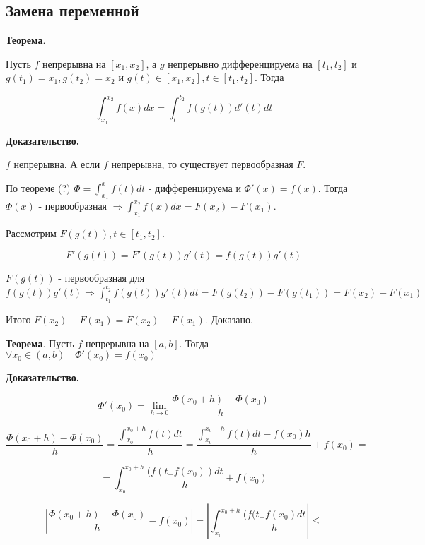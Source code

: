 \documentclass[a4paper]{article}
\begin{document}
\begin{definit}
\hypertarget{p17}{}
\subsection*{Замена переменной}

\begin{htheorem}\textbf{Теорема}.

Пусть $f$ непрерывна на $[x_1, x_2]$, а $g$ непрерывно дифференцируема на $[t_1, t_2]$ и $g(t_1) = x_1, g(t_2) = x_2$ и $g(t) \in [x_1, x_2], t \in [t_1, t_2]$. Тогда

\[
\int_{x_1}^{x_2} f(x)dx = \int_{t_1}^{t_2} f(g(t)) d'(t)dt
\]
\end{htheorem}

\begin{hproof}\textbf{Доказательство.}

$f$ непрерывна. А если $f$ непрерывна, то существует первообразная $F$.

По теореме (?) $\Phi = \int_{x_1}^x f(t)dt$ - дифференцируема и $\Phi'(x) = f(x)$. Тогда $\Phi(x)$ - первообразная $\Rightarrow \int_{x_1}^{x_2} f(x)dx = F(x_2) - F(x_1)$.

Рассмотрим $F(g(t)), t \in [t_1, t_2]$.

\[
F'(g(t)) = F'(g(t))g'(t) = f(g(t))g'(t)
\]

$F(g(t))$ - первообразная для $f(g(t))g'(t) \Rightarrow \int_{t_1}^{t_2} f(g(t))g'(t)dt = F(g(t_2)) - F(g(t_1)) = F(x_2) - F(x_1)$

Итого $F(x_2) - F(x_1) = F(x_2) - F(x_1)$. Доказано.
\end{hproof}

\begin{htheorem}\textbf{Теорема}.
Пусть $f$ непрерывна на $[a,b]$. Тогда $\forall x_0 \in (a,b) \quad \Phi'(x_0) = f(x_0)$

\end{htheorem}

\begin{hproof}\textbf{Доказательство.}

\[
\Phi'(x_0) = \lim_{h \rightarrow 0} \frac{\Phi(x_0 + h) - \Phi (x_0)}{h}
\]

\[
\frac{\Phi(x_0 + h) - \Phi (x_0)}{h} = \frac{\int_{x_0}^{x_0+h} f(t)dt}{h} = \frac{\int_{x_0}^{x_0+h} f(t)dt - f(x_0)h}{h} + f(x_0) = 
\]

\[
 = \int_{x_0}^{x_0+h} \frac{(f(t_-f(x_0))dt}{h} + f(x_0)
\]

\[
\left| \frac{\Phi(x_0+h)-\Phi(x_0)}{h} - f(x_0) \right| = \left| \int_{x_0}^{x_0+h} \frac{(f(t_-f(x_0)dt}{h} \right| \leq 
\]


\end{hproof}
\end{definit}
\end{document}
